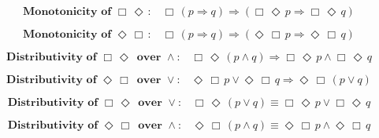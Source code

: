 \documentclass[12pt, fleqn, leqno]{article}
\newcommand{\impl}{\ensuremath{\Rightarrow}}        %
\newcommand{\Event}{\Diamond\,}
\newcommand{\Always}{\Box\,}
\newcommand{\spacer}{\vspace{-30pt}}
\begin{document}
\spacer

\begin{equation}\label{E:monoAlwaysEvent}
\textbf{Monotonicity of $\Always\Event$:}\quad \Always (p \impl q) \impl (\Always\Event p \impl \Always\Event q)
\end{equation}

\spacer

\begin{equation}\label{E:monoEventAlways}
\textbf{Monotonicity of $\Event\Always$:}\quad \Always (p \impl q) \impl (\Event\Always p \impl \Event\Always q)
\end{equation}

\spacer

\begin{equation}\label{E:distAlwaysEventAnd}
\textbf{Distributivity of $\Always\Event$ over $\land$:}\quad \Always\Event(p \land q) \impl \Always\Event p \land \Always\Event q
\end{equation}

\spacer

\begin{equation}\label{E:distEventAlwaysOr}
\textbf{Distributivity of $\Event\Always$ over $\lor$:}\quad \Event\Always p \lor \Event\Always q \impl \Event\Always (p \lor q)
\end{equation}

\spacer

\begin{equation}\label{E:distAlwaysEventOr}
\textbf{Distributivity of $\Always\Event$ over $\lor$:}\quad \Always\Event(p \lor q) \equiv \Always\Event p \lor \Always\Event q
\end{equation}

\spacer

\begin{equation}\label{E:distEventAlwaysAnd}
\textbf{Distributivity of $\Event\Always$ over $\land$:}\quad \Event\Always(p \land q) \equiv \Event\Always p \land \Event\Always q
\end{equation}
\end{document}
